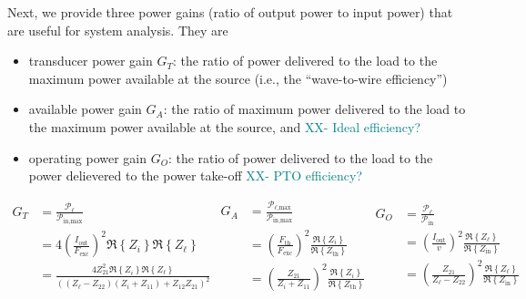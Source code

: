 \documentclass[lettersize,journal]{IEEEtran}
\newcommand{\ak}[1]{\textcolor{teal}{#1}}
\begin{document}
Next, we provide three power gains (ratio of output power to input power) that are useful for system analysis. 
They are 
\begin{itemize}
        \item transducer power gain $G_T$: the ratio of power delivered to the load to the maximum power available at the source (i.e., the ``wave-to-wire efficiency'')
        \item available power gain $G_A$: the ratio of maximum power delivered to the load to the maximum power available at the source, and \ak{XX- Ideal efficiency?}
        \item operating power gain $G_O$: the ratio of power delivered to the load to the power delievered to the power take-off \ak{XX- PTO efficiency?}
\end{itemize}
\begin{subequations}
        \begin{align}
                G_T &= \frac{\mathcal{P}_\ell}{\mathcal{P}_{\textrm{in,max}}} \nonumber \\
                &= 4\left(\frac{I_{\textrm{out}}}{F_{\textrm{exc}}}\right)^2\Re \left\{ Z_i \right\}\Re \left\{ Z_{\ell} \right\}  \nonumber \\
                &= \frac{4 Z_{21}^2 \Re \left\{ Z_i \right\}\Re \left\{ Z_{\ell} \right\}}{((Z_{\ell} - Z_{22})(Z_i + Z_{11}) + Z_{12}Z_{21})^2} \label{eq:transducer_gain}
        \end{align}
        \begin{align}
                G_A &= \frac{\mathcal{P}_{\ell\textrm{,max}}}{\mathcal{P}_{\textrm{in,max}}}  \nonumber \\
                &= \left(\frac{F_{\textrm{th}}}{F_{\textrm{exc}}}\right)^2\frac{\Re \left\{ Z_i \right\}}{\Re \left\{ Z_{\textrm{th}} \right\}} \nonumber \\
                &= \left(\frac{Z_{21}}{Z_i + Z_{11}}\right)^2\frac{\Re \left\{ Z_i \right\}}{\Re \left\{ Z_{\textrm{th}} \right\}} \label{eq:available_gain}
        \end{align}
        \begin{align}
                G_O &= \frac{\mathcal{P}_\ell}{\mathcal{P}_{\textrm{in}}}  \nonumber \\
                &= \left(\frac{I_{\textrm{out}}}{v}\right)^2\frac{\Re \left\{ Z_{\ell} \right\}}{\Re \left\{ Z_{\textrm{in}} \right\}} \nonumber \\
                &=  \left(\frac{Z_{21}}{Z_{\ell} - Z_{22}}\right)^2\frac{\Re \left\{ Z_{\ell} \right\}}{\Re \left\{ Z_{\textrm{in}} \right\}} \label{eq:operating_gain}
        \end{align}
\end{subequations}
\end{document}
